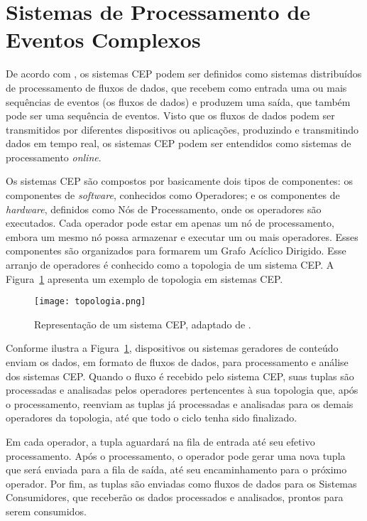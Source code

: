 \section{Sistemas de Processamento de Eventos Complexos}\label{sec:complex_event}

De acordo com , os sistemas CEP podem ser definidos como sistemas distribuídos de processamento de fluxos de dados, que recebem como entrada uma ou mais sequências de eventos (os fluxos de dados) e produzem uma saída, que também pode ser uma sequência de eventos. Visto que os fluxos de dados podem ser transmitidos por diferentes dispositivos ou aplicações, produzindo e transmitindo dados em tempo real, os sistemas CEP podem ser entendidos como sistemas de processamento \textit{online}. 


Os sistemas CEP são compostos por basicamente dois tipos de componentes: os componentes de \textit{software}, conhecidos como Operadores; e os componentes de \textit{hardware}, definidos como Nós de Processamento, onde os operadores são executados. Cada operador pode estar em apenas um nó de processamento, embora um mesmo nó possa armazenar e executar um ou mais operadores. Esses componentes são organizados para formarem um Grafo Acíclico Dirigido. Esse arranjo de operadores
é conhecido como a topologia de um sistema CEP. A Figura~\ref{fig:topologia} apresenta um exemplo de topologia em sistemas CEP.


\begin{figure}[!htb]
  \centering
    \texttt{[image: topologia.png]}
    \caption{Representação de um sistema CEP, adaptado de \cite{Gradvohl2016}.}
    \label{fig:topologia}
\end{figure}

Conforme ilustra a Figura~\ref{fig:topologia}, dispositivos ou sistemas geradores de conteúdo enviam os dados, em formato de fluxos de dados, para processamento e análise dos sistemas CEP. Quando o fluxo é recebido pelo sistema CEP, suas tuplas são processadas e analisadas pelos operadores pertencentes à sua topologia que, após o processamento, reenviam as tuplas já processadas e analisadas para os demais operadores da topologia, até que todo o ciclo tenha sido finalizado. 

Em cada operador, 
a tupla aguardará na fila de entrada até seu efetivo processamento. 
Após o processamento, o operador pode gerar uma nova tupla que será enviada para a fila de saída, 
até seu encaminhamento
para o próximo operador. Por fim, as tuplas são enviadas como fluxos de dados para os Sistemas Consumidores, que receberão os dados processados e analisados, prontos para serem consumidos. 

